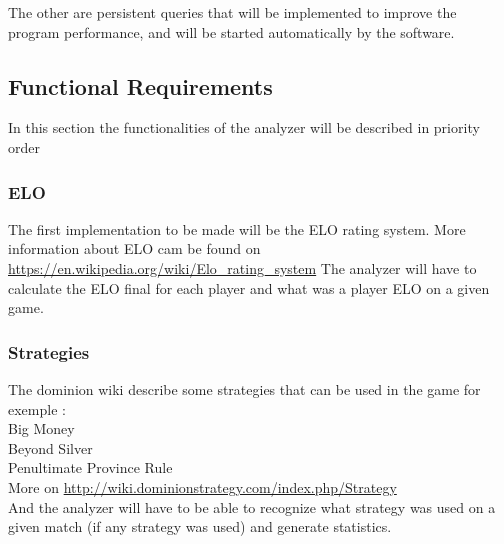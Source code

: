 \documentclass{scrreprt}
\begin{document}
The other are persistent queries that will be implemented to improve the program
performance, and will be started automatically by the software.


\subsection{Functional Requirements}


In this section the functionalities of the analyzer will be described in
priority order

\subsubsection{ELO}
The first implementation to be made will be the ELO rating system.
More information about ELO cam be found on \url{https://en.wikipedia.org/wiki/Elo_rating_system}
The analyzer will have to calculate the ELO final for each player and what was a
player ELO on a given game.

\subsubsection{Strategies}
The dominion wiki describe some strategies that can be used in the game for
exemple :\\
Big Money\\
Beyond Silver \\
Penultimate Province Rule \\
More on \url{http://wiki.dominionstrategy.com/index.php/Strategy}\\

And the analyzer will have to be able to recognize what strategy was used on a
given match (if any strategy was used) and generate statistics.\\
\end{document}
